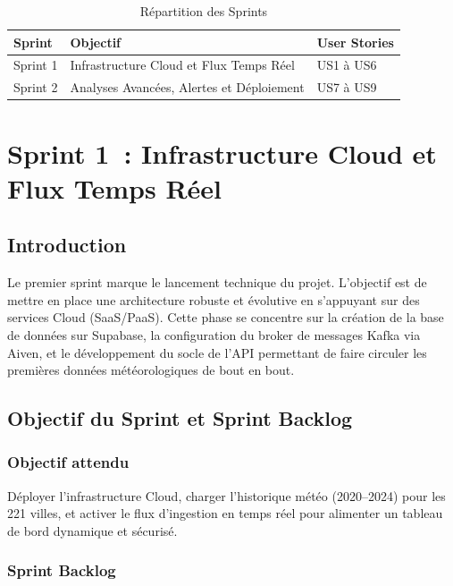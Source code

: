 \documentclass[a4paper,12pt,oneside]{report}
\begin{document}
\begin{table}[H]
\centering
\caption{Répartition des Sprints}
\label{tab:sprints}
\begin{tabularx}{\textwidth}{lXl}
\toprule
\textbf{Sprint} & \textbf{Objectif} & \textbf{User Stories} \\
\midrule
Sprint 1 & Infrastructure Cloud et Flux Temps Réel    & US1 à US6 \\
Sprint 2 & Analyses Avancées, Alertes et Déploiement   & US7 à US9 \\
\bottomrule
\end{tabularx}
\end{table}

\chapter{Sprint 1~: Infrastructure Cloud et Flux Temps Réel}

\section{Introduction}
Le premier sprint marque le lancement technique du projet. L'objectif est de mettre en place une architecture robuste et évolutive en s'appuyant sur des services Cloud (SaaS/PaaS). Cette phase se concentre sur la création de la base de données sur Supabase, la configuration du broker de messages Kafka via Aiven, et le développement du socle de l'API permettant de faire circuler les premières données météorologiques de bout en bout.

\section{Objectif du Sprint et Sprint Backlog}

\subsection{Objectif attendu}
Déployer l'infrastructure Cloud, charger l'historique météo (2020--2024) pour les 221 villes, et activer le flux d'ingestion en temps réel pour alimenter un tableau de bord dynamique et sécurisé.

\subsection{Sprint Backlog}
\end{document}

